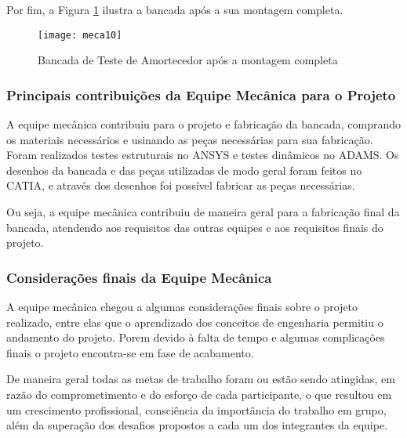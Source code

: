 	
	Por fim, a Figura \ref{meca10} ilustra a bancada após a sua montagem completa.

	\begin{figure}[!htpb]
		\centering
		\texttt{[image: meca10]}
		\caption{Bancada de Teste de Amortecedor após a montagem completa}
		\label{meca10}
	\end{figure}


\subsubsection{Principais contribuições da Equipe Mecânica para o Projeto}
	
	A equipe mecânica contribuiu para o projeto e fabricação da bancada, comprando os materiais necessários e usinando as peças necessárias para sua fabricação. Foram realizados testes estruturais no ANSYS e testes dinâmicos no ADAMS. Os desenhos da bancada e das peças utilizadas de modo geral foram feitos no CATIA, e através dos desenhos foi possível fabricar as peças necessárias. 

	Ou seja, a equipe mecânica contribuiu de maneira geral para a fabricação final da bancada, atendendo aos requisitos das outras equipes e aos requisitos finais do projeto.

\subsubsection{Considerações finais da Equipe Mecânica}

	A equipe mecânica chegou a algumas considerações finais sobre o projeto realizado, entre elas que o aprendizado dos conceitos de engenharia permitiu o andamento do projeto. Porem devido à falta de tempo e algumas complicações finais o projeto encontra-se em fase de acabamento.
	
	De maneira geral todas as metas de trabalho foram ou estão sendo atingidas, em razão do comprometimento e do esforço de cada participante, o que resultou em um crescimento profissional, consciência da importância do trabalho em grupo, além da superação dos desafios propostos a cada um dos integrantes da equipe. 

	

